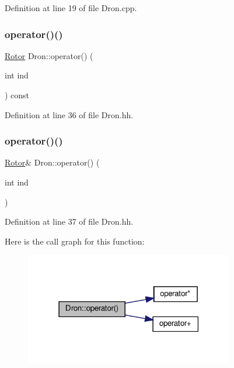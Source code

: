 Definition at line 19 of file Dron.\+cpp.

\mbox{\label{class_dron_a7ba22c83868cd96769061597d1d0ad25}} 
\subsubsection{\texorpdfstring{operator()()}{operator()()}\hspace{0.1cm}{\footnotesize\ttfamily [1/2]}}
{\footnotesize\ttfamily \hyperlink{class_rotor}{Rotor} Dron\+::operator() (\begin{DoxyParamCaption}\item[{int}]{ind }\end{DoxyParamCaption}) const\hspace{0.3cm}{\ttfamily [inline]}}



Definition at line 36 of file Dron.\+hh.

\mbox{\label{class_dron_a0eb520dc02cf3b2df93d5ce5cf240dbc}} 
\subsubsection{\texorpdfstring{operator()()}{operator()()}\hspace{0.1cm}{\footnotesize\ttfamily [2/2]}}
{\footnotesize\ttfamily \hyperlink{class_rotor}{Rotor}\& Dron\+::operator() (\begin{DoxyParamCaption}\item[{int}]{ind }\end{DoxyParamCaption})\hspace{0.3cm}{\ttfamily [inline]}}



Definition at line 37 of file Dron.\+hh.

Here is the call graph for this function\+:
\nopagebreak
\begin{figure}[H]
\begin{center}
\leavevmode
\includegraphics[width=259pt]{class_dron_a0eb520dc02cf3b2df93d5ce5cf240dbc_cgraph}
\end{center}
\end{figure}
\mbox{\label{class_dron_ae217b4b77f300658ade9817dbc3d0ffa}} 
